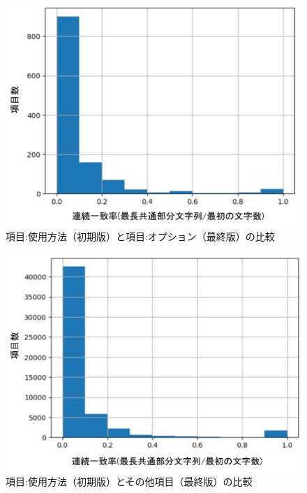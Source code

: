 \documentclass[submit]{ipsj}
\begin{document}
\begin{figure}[t]
 	\centering
		\includegraphics[width=1.0\linewidth]{./IPSJ202303_Ishioka/head_usag_opt.pdf}
	\caption{項目:使用方法（初期版）と項目:オプション（最終版）の比較}
	\label{fig:oss_developments}
\end{figure}
\begin{figure}[t]
 	\centering
		\includegraphics[width=1.0\linewidth]{./IPSJ202303_Ishioka/head_usag_all.pdf}
	\caption{項目:使用方法（初期版）とその他項目（最終版）の比較}
	\label{fig:oss_developments}
\end{figure}
\end{document}
